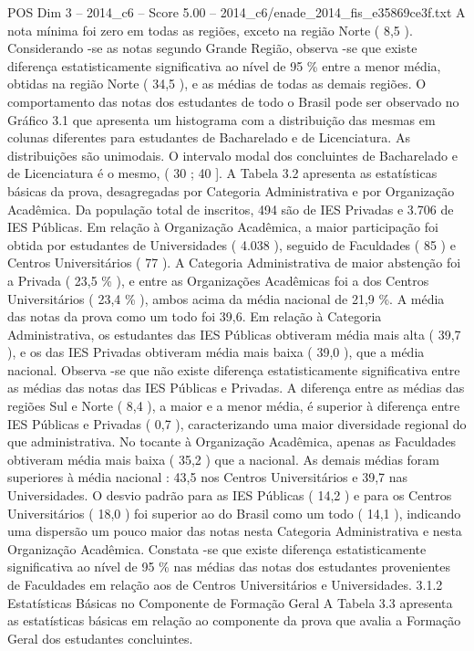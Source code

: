 \begin{textsample}{POS Dim 3 – 2014\_c6 – Score 5.00 – 2014\_c6/enade\_2014\_fis\_e35869ce3f.txt}
A nota mínima foi zero em todas as regiões, exceto na região Norte ( 8,5 ).
Considerando -se as notas segundo Grande Região, observa -se que existe diferença estatisticamente significativa ao nível de 95 \% entre a menor média, obtidas na região Norte ( 34,5 ), e as médias de todas as demais regiões.
O comportamento das notas dos estudantes de todo o Brasil pode ser observado no Gráfico 3.1 que apresenta um histograma com a distribuição das mesmas em colunas diferentes para estudantes de Bacharelado e de Licenciatura.
As distribuições são unimodais.
O intervalo modal dos concluintes de Bacharelado e de Licenciatura é o mesmo, ( 30 ; 40 ].
A Tabela 3.2 apresenta as estatísticas básicas da prova, desagregadas por Categoria Administrativa e por Organização Acadêmica.
Da população total de inscritos, 494 são de IES Privadas e 3.706 de IES Públicas.
Em relação à Organização Acadêmica, a maior participação foi obtida por estudantes de Universidades ( 4.038 ), seguido de Faculdades ( 85 ) e Centros Universitários ( 77 ).
A Categoria Administrativa de maior abstenção foi a Privada ( 23,5 \% ), e entre as Organizações Acadêmicas foi a dos Centros Universitários ( 23,4 \% ), ambos acima da média nacional de 21,9 \%.
A média das notas da prova como um todo foi 39,6.
Em relação à Categoria Administrativa, os estudantes das IES Públicas obtiveram média mais alta ( 39,7 ), e os das IES Privadas obtiveram média mais baixa ( 39,0 ), que a média nacional.
Observa -se que não existe diferença estatisticamente significativa entre as médias das notas das IES Públicas e Privadas.
A diferença entre as médias das regiões Sul e Norte ( 8,4 ), a maior e a menor média, é superior à diferença entre IES Públicas e Privadas ( 0,7 ), caracterizando uma maior diversidade regional do que administrativa.
No tocante à Organização Acadêmica, apenas as Faculdades obtiveram média mais baixa ( 35,2 ) que a nacional.
As demais médias foram superiores à média nacional : 43,5 nos Centros Universitários e 39,7 nas Universidades.
O desvio padrão para as IES Públicas ( 14,2 ) e para os Centros Universitários ( 18,0 ) foi superior ao do Brasil como um todo ( 14,1 ), indicando uma dispersão um pouco maior das notas nesta Categoria Administrativa e nesta Organização Acadêmica.
Constata -se que existe diferença estatisticamente significativa ao nível de 95 \% nas médias das notas dos estudantes provenientes de Faculdades em relação aos de Centros Universitários e Universidades. 3.1.2 Estatísticas Básicas no Componente de Formação Geral A Tabela 3.3 apresenta as estatísticas básicas em relação ao componente da prova que avalia a Formação Geral dos estudantes concluintes.

\end{textsample}
